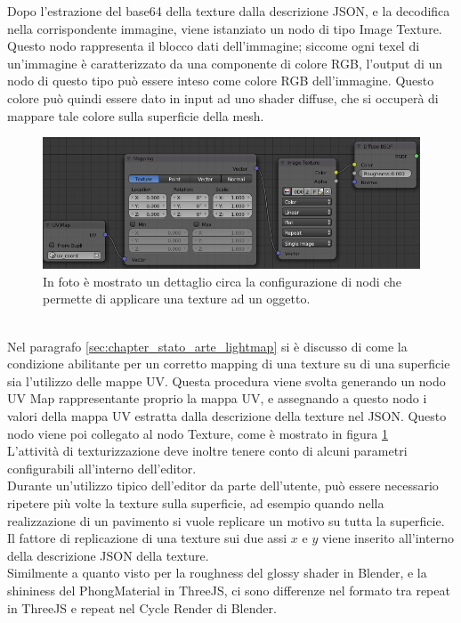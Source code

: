 Dopo l’estrazione del base64 della texture dalla descrizione JSON, e la decodifica nella corrispondente immagine, viene istanziato un nodo di tipo Image Texture. Questo nodo rappresenta il blocco dati dell’immagine; siccome ogni texel di un’immagine è caratterizzato da una componente di colore RGB, l’output di un nodo di questo tipo può essere inteso come colore RGB dell’immagine. Questo colore può quindi essere dato in input ad uno shader diffuse, che si occuperà di mappare tale colore sulla superficie della mesh. 
\\
\begin{figure}[htb]
 \centering
 \includegraphics[width=1\linewidth]{images/chapter_baking_service/ba_se_diffuse_uv_ma.png}\hfill
 \caption[Mappatura texturizzazione]{In foto è mostrato un dettaglio circa la configurazione di nodi che permette di applicare una texture ad un oggetto.}
 \label{fig:ba_se_diffuse_uv_ma}
\end{figure}
\\
Nel paragrafo \ref{sec:chapter_stato_arte_lightmap} si è discusso di come la condizione abilitante per un corretto mapping di una texture su di una superficie sia l’utilizzo delle mappe UV. Questa procedura viene svolta generando un nodo UV Map rappresentante proprio la mappa UV, e assegnando a questo nodo i valori della mappa UV estratta dalla descrizione della texture nel JSON. Questo nodo viene poi collegato al nodo Texture, come è mostrato in figura \ref{fig:ba_se_diffuse_uv_ma}
\\
L’attività di texturizzazione deve inoltre tenere conto di alcuni parametri configurabili all’interno dell’editor. 
\\
Durante un’utilizzo tipico dell’editor da parte dell’utente, può essere necessario ripetere più volte la texture sulla superficie, ad esempio quando nella realizzazione di un pavimento si vuole replicare un motivo su tutta la superficie. Il fattore di replicazione di una texture sui due assi $x$ e $y$ viene inserito all’interno della descrizione JSON della texture.
\\
Similmente a quanto visto per la roughness del glossy shader in Blender, e la shininess del PhongMaterial in ThreeJS, ci sono differenze nel formato tra repeat in ThreeJS e repeat nel Cycle Render di Blender.
